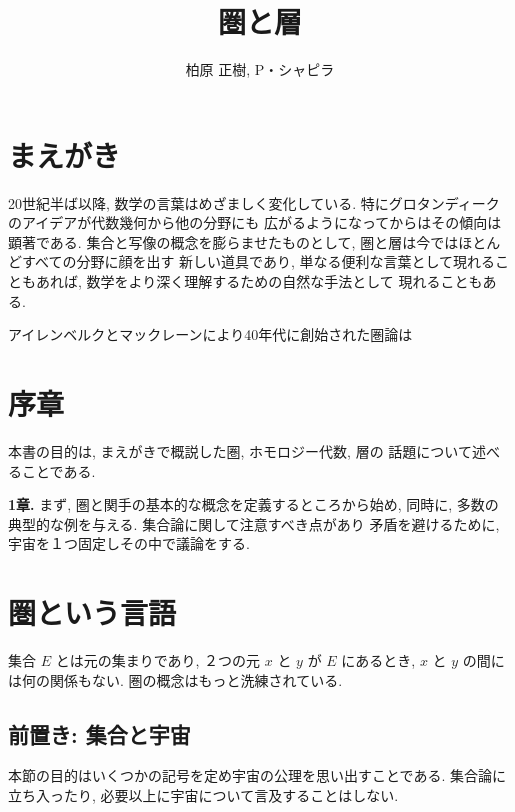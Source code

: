 \documentclass[a5paper, dvipdfmx]{jsbook}
\title{圏と層}
\author{柏原 正樹, P・シャピラ}
\date{}
\theoremstyle{definition}
\numberwithin{equation}{section} %
\begin{document}
\maketitle

\chapter*{まえがき}
20世紀半ば以降, 数学の言葉はめざましく変化している. 
特にグロタンディークのアイデアが代数幾何から他の分野にも
広がるようになってからはその傾向は顕著である. 
集合と写像の概念を膨らませたものとして, 
圏と層は今ではほとんどすべての分野に顔を出す
新しい道具であり, 
単なる便利な言葉として現れることもあれば, 
数学をより深く理解するための自然な手法として
現れることもある. 

アイレンベルクとマックレーンにより40年代に創始された圏論は


\tableofcontents

\chapter*{序章}


本書の目的は, まえがきで概説した圏, ホモロジー代数, 層の
話題について述べることである. 

\textbf{1章.} 
まず, 圏と関手の基本的な概念を定義するところから始め, 
同時に, 多数の典型的な例を与える. 
集合論に関して注意すべき点があり
矛盾を避けるために, 
宇宙を１つ固定しその中で議論をする. 


\chapter{圏という言語}

集合 $E$ とは元の集まりであり, 
２つの元 $x$ と $y$ が $E$ にあるとき, 
$x$ と $y$ の間には何の関係もない. 
圏の概念はもっと洗練されている. 

\section{前置き: 集合と宇宙}

本節の目的はいくつかの記号を定め宇宙の公理を思い出すことである. 
集合論に立ち入ったり, 必要以上に宇宙について言及することはしない. 
\end{document}
